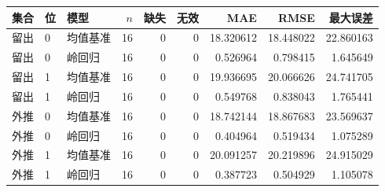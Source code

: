 \begin{tabular}{lllrrrrrr}
\toprule
集合 & 位 & 模型 & $n$ & 缺失 & 无效 & MAE & RMSE & 最大误差\\
\midrule
留出 & 0 & 均值基准 & 16 & 0 & 0 & 18.320612 & 18.448022 & 22.860163\\
留出 & 0 & 岭回归 & 16 & 0 & 0 & 0.526964 & 0.798415 & 1.645649\\
留出 & 1 & 均值基准 & 16 & 0 & 0 & 19.936695 & 20.066626 & 24.741705\\
留出 & 1 & 岭回归 & 16 & 0 & 0 & 0.549768 & 0.838043 & 1.765441\\
外推 & 0 & 均值基准 & 16 & 0 & 0 & 18.742144 & 18.867683 & 23.569637\\
外推 & 0 & 岭回归 & 16 & 0 & 0 & 0.404964 & 0.519434 & 1.075289\\
外推 & 1 & 均值基准 & 16 & 0 & 0 & 20.091257 & 20.219896 & 24.915029\\
外推 & 1 & 岭回归 & 16 & 0 & 0 & 0.387723 & 0.504929 & 1.105078\\
\bottomrule
\end{tabular}
